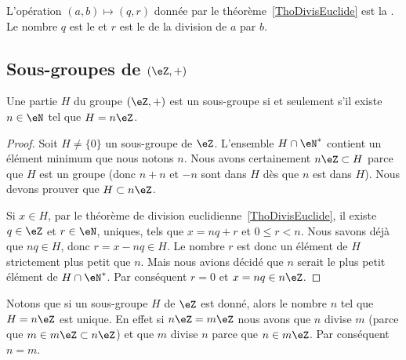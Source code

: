 \begin{definition}
    L'opération \( (a,b)\mapsto(q,r)\) donnée par le théorème~\ref{ThoDivisEuclide} est la . Le nombre \( q\) est le  et \( r\) est le  de la division de \( a\) par \( b\).
\end{definition}


\subsection{Sous-groupes de \texorpdfstring{$(\eZ,+)$}{(Z,+)}}

\begin{proposition} \label{PropSsgpZestnZ}
    Une partie \( H\) du groupe \( (\eZ,+)\) est un sous-groupe si et seulement s'il existe \( n\in\eN\) tel que \( H=n\eZ\).
\end{proposition}

\begin{proof}
    Soit \( H\neq\{ 0 \}\) un sous-groupe de \( \eZ\). L'ensemble \( H\cap\eN^*\) contient un élément minimum que nous notons \( n\). Nous avons certainement \( n\eZ\subset H\) parce que \( H\) est un groupe (donc \( n+n\) et \( -n\) sont dans \( H\) dès que \( n\) est dans \( H\)). Nous devons prouver que \( H\subset n\eZ\).

    Si \( x\in H\), par le théorème de division euclidienne~\ref{ThoDivisEuclide}, il existe \( q\in\eZ\) et \( r\in\eN \), uniques, tels que \( x=nq+r\) et \(0 \leq r < n \). Nous savons déjà que \( nq\in H\), donc \( r = x - nq \in H \). Le nombre \( r\) est donc un élément de \( H\) strictement plus petit que \( n\). Mais nous avions décidé que \( n\) serait le plus petit élément de \( H\cap\eN^*\). Par conséquent \( r=0\) et \( x=nq\in n\eZ\).
\end{proof}


Notons que si un sous-groupe \( H\) de \( \eZ\) est donné, alors le nombre \( n\) tel que \( H=n\eZ\) est unique. En effet si \( n\eZ=m\eZ\) nous avons que \( n\) divise \( m\) (parce que \( m\in m\eZ\subset n\eZ\)) et que \( m\) divise \( n\) parce que \( n\in m\eZ\). Par conséquent \( n=m\).


